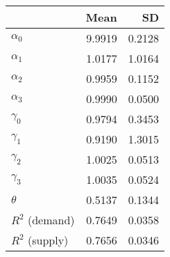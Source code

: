 
\begin{tabular}[t]{lrr}
\toprule
  & Mean & SD\\
\midrule
$\alpha_{0}$ & 9.9919 & 0.2128\\
$\alpha_{1}$ & 1.0177 & 1.0164\\
$\alpha_{2}$ & 0.9959 & 0.1152\\
$\alpha_{3}$ & 0.9990 & 0.0500\\
$\gamma_{0}$ & 0.9794 & 0.3453\\
$\gamma_{1}$ & 0.9190 & 1.3015\\
$\gamma_{2}$ & 1.0025 & 0.0513\\
$\gamma_{3}$ & 1.0035 & 0.0524\\
$\theta$ & 0.5137 & 0.1344\\
$R^{2}$ (demand) & 0.7649 & 0.0358\\
$R^{2}$ (supply) & 0.7656 & 0.0346\\
\bottomrule
\end{tabular}
